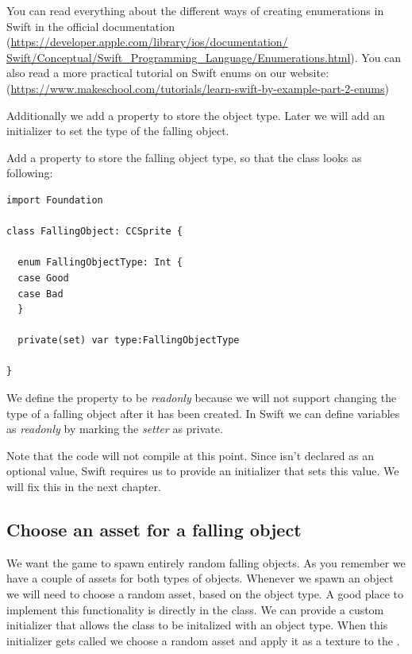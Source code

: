 \begin{details}[frametitle={Enumerations in Swift}] 
You can read everything about the different ways of creating enumerations in
Swift in the official documentation
(\url{https://developer.apple.com/library/ios/documentation/
Swift/Conceptual/Swift_Programming_Language/Enumerations.html}).
You can also read a more practical tutorial on Swift enums on our website:
(\url{https://www.makeschool.com/tutorials/learn-swift-by-example-part-2-enums})
\end{details}

Additionally we add a property to store the object type. Later we will
add an initializer to set the type of the falling object. 

\begin{leftbar}
Add a property to store the falling object type, so that the class looks as
following:
\begin{lstlisting}
import Foundation

class FallingObject: CCSprite {

  enum FallingObjectType: Int {
  case Good
  case Bad
  }
    
  private(set) var type:FallingObjectType
  
}
\end{lstlisting}
\end{leftbar}

We define the property to be \textit{readonly} because we will not
support changing the type of a falling object after it has been created. In Swift we can 
define variables as \textit{readonly} by marking the \textit{setter} as private.

Note that the code will not compile at this point. Since  isn't
declared as an optional value, Swift requires us to provide an initializer that
sets this value. We will fix this in the next chapter.

\subsection{Choose an asset for a falling object}
We want the game to spawn entirely random falling objects. As you remember we
have a couple of assets for both types of objects. Whenever we spawn an object
we will need to choose a random asset, based on the object type. A good place to
implement this functionality is directly in the 
class. We can provide a custom initializer that allows the class to be initalized with an object type.
When this initializer gets called we choose a random asset and apply it as a
texture to the .

